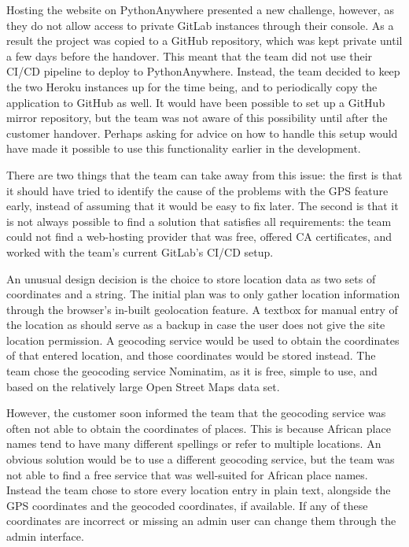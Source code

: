 \documentclass{l3proj}
\begin{document}
Hosting the website on PythonAnywhere presented a new challenge, however, as they do not allow access to private GitLab instances through their console. As a result the project was copied to a GitHub repository, which was kept private until a few days before the handover. This meant that the team did not use their CI/CD pipeline to deploy to PythonAnywhere. Instead, the team decided to keep the two Heroku instances up for the time being, and to periodically copy the application to GitHub as well. It would have been possible to set up a GitHub mirror repository, but the team was not aware of this possibility until after the customer handover. Perhaps asking for advice on how to handle this setup would have made it possible to use this functionality earlier in the development.

There are two things that the team can take away from this issue: the first is that it should have tried to identify the cause of the problems with the GPS feature early, instead of assuming that it would be easy to fix later. The second is that it is not always possible to find a solution that satisfies all requirements: the team could not find a web-hosting provider that was free, offered CA certificates, and worked with the team's current GitLab's CI/CD setup.

An unusual design decision is the choice to store location data as two sets of coordinates and a string. The initial plan was to only gather location information through the browser's in-built geolocation feature. A textbox for manual entry of the location as should serve as a backup in case the user does not give the site location permission. A geocoding service would be used to obtain the coordinates of that entered location, and those coordinates would be stored instead. The team chose the geocoding service Nominatim, as it is free, simple to use, and based on the relatively large Open Street Maps data set.

However, the customer soon informed the team that the geocoding service was often not able to obtain the coordinates of places. This is because African place names tend to have many different spellings or refer to multiple locations. An obvious solution would be to use a different geocoding service, but the team was not able to find a free service that was well-suited for African place names. Instead the team chose to store every location entry in plain text, alongside the GPS coordinates and the geocoded coordinates, if available. If any of these coordinates are incorrect or missing an admin user can change them through the admin interface.
\end{document}
